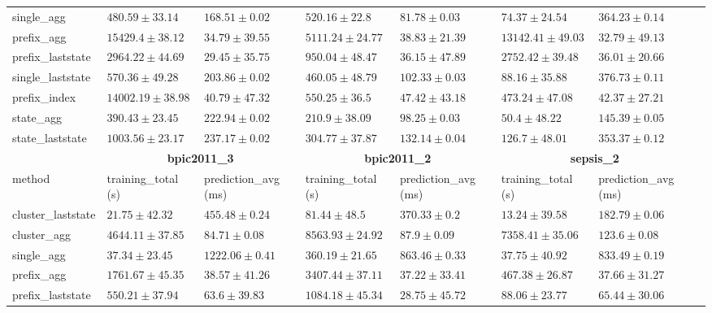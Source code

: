 \documentclass[twoside,11pt]{Latex/Classes/PhDthesisPSnPDF}
\begin{document}
\begin{table}[h]
{\begin{tabular}{llllllll}
			single\_agg & $480.59 \pm 33.14$ & $168.51 \pm 0.02$ & $520.16 \pm 22.8$ & $81.78 \pm 0.03$ & $74.37 \pm 24.54$ & $364.23 \pm 0.14$ \\ 
			prefix\_agg & $15429.4 \pm 38.12$ & $34.79 \pm 39.55$ & $5111.24 \pm 24.77$ & $38.83 \pm 21.39$ & $13142.41 \pm 49.03$ & $\mathbf{32.79 \pm 49.13}$ \\ 
			prefix\_laststate & $2964.22 \pm 44.69$ & $\mathbf{29.45 \pm 35.75}$ & $950.04 \pm 48.47$ & $36.15 \pm 47.89$ & $2752.42 \pm 39.48$ & $36.01 \pm 20.66$ \\ 
			single\_laststate & $570.36 \pm 49.28$ & $203.86 \pm 0.02$ & $460.05 \pm 48.79$ & $102.33 \pm 0.03$ & $88.16 \pm 35.88$ & $376.73 \pm 0.11$ \\ 
			prefix\_index & $14002.19 \pm 38.98$ & $40.79 \pm 47.32$ & $550.25 \pm 36.5$ & $47.42 \pm 43.18$ & $473.24 \pm 47.08$ & $42.37 \pm 27.21$ \\ 
			state\_agg & $\mathbf{390.43 \pm 23.45}$ & $222.94 \pm 0.02$ & $\mathbf{210.9 \pm 38.09}$ & $98.25 \pm 0.03$ & $\mathbf{50.4 \pm 48.22}$ & $145.39 \pm 0.05$ \\ 
			state\_laststate & $1003.56 \pm 23.17$ & $237.17 \pm 0.02$ & $304.77 \pm 37.87$ & $132.14 \pm 0.04$ & $126.7 \pm 48.01$ & $353.37 \pm 0.12$ \\ 
			\bottomrule
			\toprule
			& \multicolumn{2}{c}{{\bfseries bpic2011\_3}} & \multicolumn{2}{c}{{\bfseries bpic2011\_2}} & \multicolumn{2}{c}{{\bfseries sepsis\_2}} \\ \cmidrule(lr){2-3} \cmidrule(lr){4-5} \cmidrule(lr){6-7}
			method  & training\_total (s) & prediction\_avg (ms) & training\_total (s) & prediction\_avg (ms) & training\_total (s) & prediction\_avg (ms) \\ \midrule
			cluster\_laststate & $\mathbf{21.75 \pm 42.32}$ & $455.48 \pm 0.24$ & $81.44 \pm 48.5$ & $370.33 \pm 0.2$ & $13.24 \pm 39.58$ & $182.79 \pm 0.06$ \\ 
			cluster\_agg & $4644.11 \pm 37.85$ & $84.71 \pm 0.08$ & $8563.93 \pm 24.92$ & $87.9 \pm 0.09$ & $7358.41 \pm 35.06$ & $123.6 \pm 0.08$ \\ 
			single\_agg & $37.34 \pm 23.45$ & $1222.06 \pm 0.41$ & $360.19 \pm 21.65$ & $863.46 \pm 0.33$ & $37.75 \pm 40.92$ & $833.49 \pm 0.19$ \\ 
			prefix\_agg & $1761.67 \pm 45.35$ & $\mathbf{38.57 \pm 41.26}$ & $3407.44 \pm 37.11$ & $37.22 \pm 33.41$ & $467.38 \pm 26.87$ & $\mathbf{37.66 \pm 31.27}$ \\ 
			prefix\_laststate & $550.21 \pm 37.94$ & $63.6 \pm 39.83$ & $1084.18 \pm 45.34$ & $\mathbf{28.75 \pm 45.72}$ & $88.06 \pm 23.77$ & $65.44 \pm 30.06$ \\ 

\end{tabular}}
\end{table}
\end{document}
